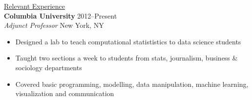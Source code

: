 \documentclass{article}
\renewcommand{\subsection}[4]{\textbf{#1} \hfill #2 \\ \emph{#3} \hfill #4\smallskip}
\renewcommand{\section}[1]{\underline{#1}\\}
\begin{document}
\section{Relevant Experience}
\subsection{Columbia University}{2012--Present}{Adjunct Professor}{New York, NY}
\begin{itemize}
\item Designed a lab to teach computational statististics to data science students
\item Taught two sections a week to students from stats, journalism, business \& sociology departments
\item Covered basic programming, modelling, data manipulation, machine learning, visualization and communication
\end{itemize}

\end{document}
